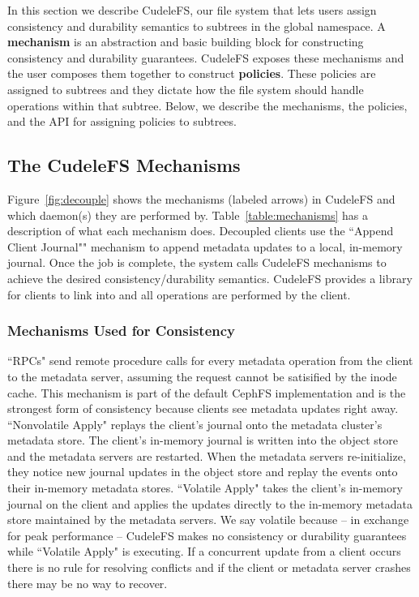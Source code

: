 In this section we describe CudeleFS, our file system that lets users
assign consistency and durability semantics to subtrees in the global
namespace. A \textbf{mechanism} is an abstraction and basic building block for
constructing consistency and durability guarantees. CudeleFS exposes these
mechanisms and the user composes them together to construct
\textbf{policies}. These policies are assigned to subtrees and they dictate how
the file system should handle operations within that subtree.  Below, we
describe the mechanisms, the policies, and the API for assigning policies to
subtrees.

\subsection{The CudeleFS Mechanisms}
\label{sec:the-cudelesfs-mechanisms}

Figure~\ref{fig:decouple} shows the mechanisms (labeled arrows) in CudeleFS and
which daemon(s) they are performed by.  Table~\ref{table:mechanisms} has a
description of what each mechanism does.  Decoupled clients use the ``Append Client Journal""
mechanism to append metadata updates to a local, in-memory journal. Once the
job is complete, the system calls CudeleFS mechanisms to achieve the desired
consistency/durability semantics.  CudeleFS provides a library for clients to
link into and all operations are performed by the client.  

\subsubsection{Mechanisms Used for Consistency} ``RPCs" send remote procedure
calls for every metadata operation from the client to the metadata server,
assuming the request cannot be satisified by the inode cache. This mechanism is
part of the default CephFS implementation and is the strongest form of
consistency because clients see metadata updates right away.  ``Nonvolatile
Apply" replays the client's journal onto the metadata cluster's metadata store.
The client's in-memory journal is written into the object store and the
metadata servers are restarted. When the metadata servers re-initialize, they
notice new journal updates in the object store and replay the events onto their
in-memory metadata stores.  ``Volatile Apply" takes the client's in-memory journal on the
client and applies the updates directly to the in-memory metadata store maintained
by the metadata servers. We say volatile because -- in exchange for peak
performance -- CudeleFS makes no consistency or durability guarantees while
``Volatile Apply" is executing.  If a concurrent update from a client occurs
there is no rule for resolving conflicts and if the client or metadata server
crashes there may be no way to recover.

